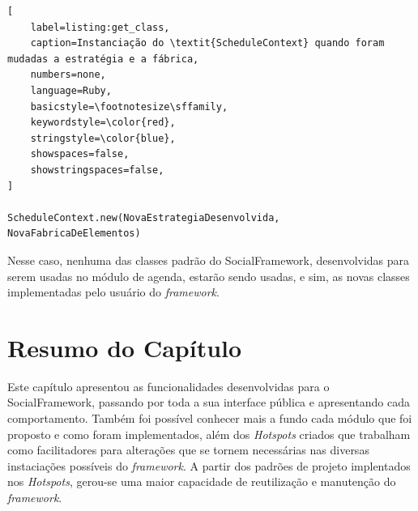 \begin{lstlisting}[
    label=listing:get_class,
    caption=Instanciação do \textit{ScheduleContext} quando foram mudadas a estratégia e a fábrica,
    numbers=none,
    language=Ruby,
    basicstyle=\footnotesize\sffamily,
    keywordstyle=\color{red},
    stringstyle=\color{blue},
    showspaces=false,
    showstringspaces=false,
]

ScheduleContext.new(NovaEstrategiaDesenvolvida, NovaFabricaDeElementos)
\end{lstlisting}

Nesse caso, nenhuma das classes padrão do SocialFramework, desenvolvidas para serem usadas no módulo de agenda, estarão sendo usadas, e sim, as novas classes implementadas pelo usuário do \textit{framework}.

\section{Resumo do Capítulo}

Este capítulo apresentou as funcionalidades desenvolvidas para o SocialFramework, passando por toda a sua interface pública e apresentando cada comportamento. Também foi possível conhecer mais a fundo cada módulo que foi proposto e como foram implementados, além dos \textit{Hotspots} criados que trabalham como facilitadores para alterações que se tornem necessárias nas diversas instaciações possíveis do \textit{framework}. A partir dos padrões de projeto implentados nos \textit{Hotspots}, gerou-se uma maior capacidade de reutilização e manutenção do \textit{framework}.
